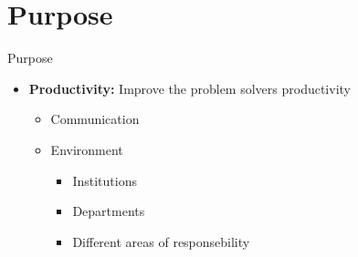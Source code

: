 \section{Purpose}
\begin{frame}{Purpose}

\begin{itemize}
	\item \textbf{Productivity:} Improve the problem solvers productivity
	\begin{itemize}
		\item Communication
		\item Environment
		\begin{itemize}
			\item Institutions
			\item Departments
			\item Different areas of responsebility
			\end{itemize}
	\end{itemize}
\end{itemize}


\end{frame}
